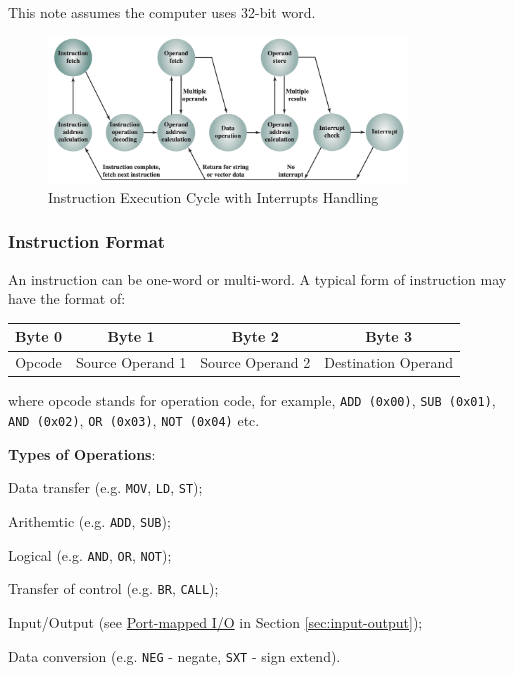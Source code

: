 \begin{remark}
    This note assumes the computer uses 32-bit word.
\end{remark}

\begin{figure}[H]
    \centering
    \includegraphics[width=0.85\textwidth]{chaps/instruction-execution-cycle/instruction-cycle-interrupts.png}
    \caption{Instruction Execution Cycle with Interrupts Handling}
\end{figure}

\subsubsection{Instruction Format}

An instruction can be one-word or multi-word. A typical form of instruction may have the
format of:
\begin{table}[H]
    \centering
    \begin{tabular}{cccc}
        Byte 0                       & Byte 1                                & Byte 2                                & Byte 3                                   \\ \hline
        \multicolumn{1}{|c|}{Opcode} & \multicolumn{1}{c|}{Source Operand 1} & \multicolumn{1}{c|}{Source Operand 2} & \multicolumn{1}{c|}{Destination Operand} \\ \hline
    \end{tabular}
\end{table}
where opcode stands for operation code, for example, \texttt{ADD (0x00)}, \texttt{SUB (0x01)},
\texttt{AND (0x02)}, \texttt{OR (0x03)}, \texttt{NOT (0x04)} etc.


\textbf{Types of Operations}: \begin{enumerate*}[label=\textbf{(\arabic*)}]
    \item Data transfer (e.g. \texttt{MOV}, \texttt{LD}, \texttt{ST});
    \item Arithemtic (e.g. \texttt{ADD}, \texttt{SUB});
    \item Logical (e.g. \texttt{AND}, \texttt{OR}, \texttt{NOT});
    \item Transfer of control (e.g. \texttt{BR}, \texttt{CALL});
    \item Input/Output (see \hyperref[lbl:port-mapped-io]{Port-mapped I/O} in Section \ref{sec:input-output});
    \item Data conversion (e.g. \texttt{NEG} - negate, \texttt{SXT} - sign extend).
\end{enumerate*}

